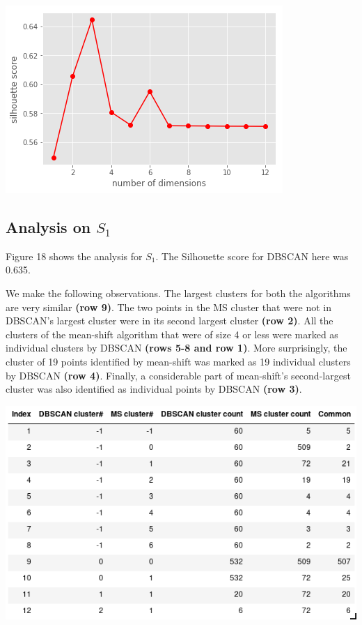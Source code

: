\documentclass[12pt,a4paper]{article}
\begin{document}
\includegraphics[scale=0.7]{pca.png}
\begingroup
{}
\endgroup

\subsection{Analysis on $S_1$}
Figure 18 shows the analysis for $S_1$. The Silhouette score for DBSCAN here was 0.635.

We make the following observations. The largest clusters for both the algorithms are very similar \textbf{(row 9)}. The two points in the MS cluster that were not in DBSCAN's largest cluster were in its second largest cluster \textbf{(row 2)}. All the clusters of the mean-shift algorithm that were of size 4 or less were marked as individual clusters by DBSCAN \textbf{(rows 5-8 and row 1)}. More surprisingly, the cluster of 19 points identified by mean-shift was marked as 19 individual clusters by DBSCAN \textbf{(row 4)}. Finally, a considerable part of mean-shift's second-largest cluster was also identified as individual points by DBSCAN \textbf{(row 3)}.

\includegraphics[scale=0.65]{cluster_s1.png}
\begingroup
{}
\endgroup
\end{document}
